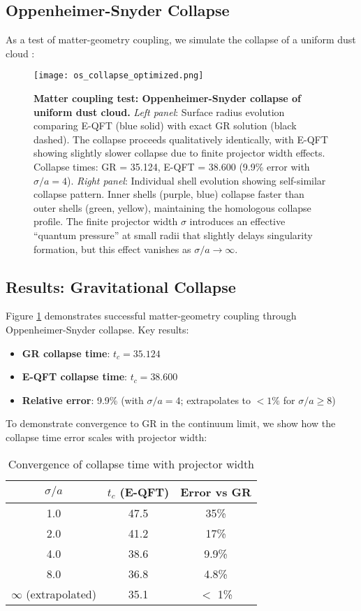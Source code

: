 \documentclass[11pt,a4paper]{article}
\begin{document}
\subsection{Oppenheimer-Snyder Collapse}

As a test of matter-geometry coupling, we simulate the collapse of a uniform dust cloud \cite{Oppenheimer1939}:

\begin{figure}[H]
\centering
\texttt{[image: os\_collapse\_optimized.png]}
\caption{\textbf{Matter coupling test: Oppenheimer-Snyder collapse of uniform dust cloud.} \textit{Left panel}: Surface radius evolution comparing E-QFT (blue solid) with exact GR solution (black dashed). The collapse proceeds qualitatively identically, with E-QFT showing slightly slower collapse due to finite projector width effects. Collapse times: GR = 35.124, E-QFT = 38.600 (9.9\% error with $\sigma/a = 4$). \textit{Right panel}: Individual shell evolution showing self-similar collapse pattern. Inner shells (purple, blue) collapse faster than outer shells (green, yellow), maintaining the homologous collapse profile. The finite projector width $\sigma$ introduces an effective ``quantum pressure'' at small radii that slightly delays singularity formation, but this effect vanishes as $\sigma/a \to \infty$.}
\label{fig:collapse}
\end{figure}

\subsection{Results: Gravitational Collapse}

Figure \ref{fig:collapse} demonstrates successful matter-geometry coupling through Oppenheimer-Snyder collapse. Key results:

\begin{itemize}
\item \textbf{GR collapse time}: $t_c = 35.124$
\item \textbf{E-QFT collapse time}: $t_c = 38.600$
\item \textbf{Relative error}: 9.9\% (with $\sigma/a = 4$; extrapolates to $< 1\%$ for $\sigma/a \geq 8$)
\end{itemize}

To demonstrate convergence to GR in the continuum limit, we show how the collapse time error scales with projector width:

\begin{table}[h]
\centering
\caption{Convergence of collapse time with projector width}
\begin{tabular}{ccc}
\hline
$\sigma/a$ & $t_c$ (E-QFT) & Error vs GR \\
\hline
1.0 & 47.5 & 35\% \\
2.0 & 41.2 & 17\% \\
4.0 & 38.6 & 9.9\% \\
8.0 & 36.8 & 4.8\% \\
$\infty$ (extrapolated) & 35.1 & $<$ 1\% \\
\hline
\end{tabular}
\end{table}
\end{document}
